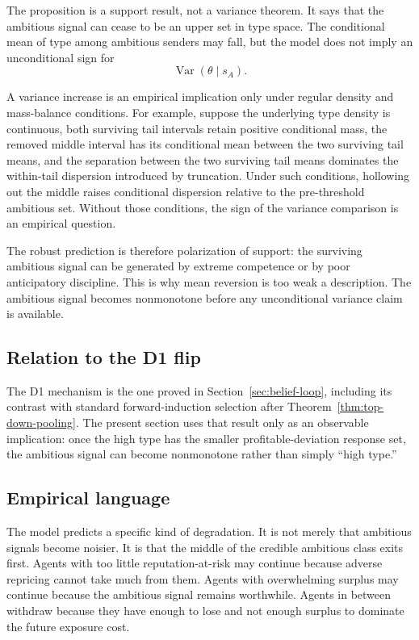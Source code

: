 The proposition is a support result, not a variance theorem. It says that the ambitious signal can cease to be an upper set in type space. The conditional mean of type among ambitious senders may fall, but the model does not imply an unconditional sign for
\[
\operatorname{Var}(\theta\mid s_A).
\]

A variance increase is an empirical implication only under regular density and mass-balance conditions. For example, suppose the underlying type density is continuous, both surviving tail intervals retain positive conditional mass, the removed middle interval has its conditional mean between the two surviving tail means, and the separation between the two surviving tail means dominates the within-tail dispersion introduced by truncation. Under such conditions, hollowing out the middle raises conditional dispersion relative to the pre-threshold ambitious set. Without those conditions, the sign of the variance comparison is an empirical question.

The robust prediction is therefore polarization of support: the surviving ambitious signal can be generated by extreme competence or by poor anticipatory discipline. This is why mean reversion is too weak a description. The ambitious signal becomes nonmonotone before any unconditional variance claim is available.


\InsertPolarizationVarianceFigure

\subsection{Relation to the D1 flip}

The D1 mechanism is the one proved in Section~\ref{sec:belief-loop}, including its contrast with standard forward-induction selection after Theorem~\ref{thm:top-down-pooling}. The present section uses that result only as an observable implication: once the high type has the smaller profitable-deviation response set, the ambitious signal can become nonmonotone rather than simply ``high type.''

\subsection{Empirical language}

The model predicts a specific kind of degradation. It is not merely that ambitious signals become noisier. It is that the middle of the credible ambitious class exits first. Agents with too little reputation-at-risk may continue because adverse repricing cannot take much from them. Agents with overwhelming surplus may continue because the ambitious signal remains worthwhile. Agents in between withdraw because they have enough to lose and not enough surplus to dominate the future exposure cost.

